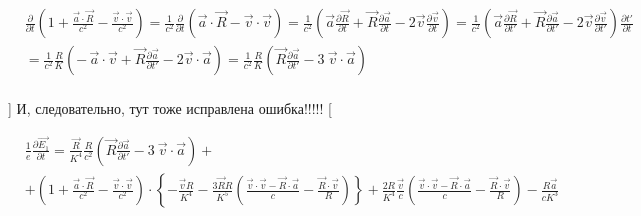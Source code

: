 \documentclass[11pt]{article}
\begin{document}
\begin{align}
  & \frac{\partial }{\partial t}\left( 1+\frac{\overrightarrow{a}\cdot \overrightarrow{R}}{{{c}^{2}}}-\frac{\overrightarrow{v}\cdot \overrightarrow{v}}{{{c}^{2}}} \right)=\frac{1}{{{c}^{2}}}\frac{\partial }{\partial t}\left( \overrightarrow{a}\cdot \overrightarrow{R}-\overrightarrow{v}\cdot \overrightarrow{v} \right)=\frac{1}{{{c}^{2}}}\left( \overrightarrow{a}\frac{\partial \overrightarrow{R}}{\partial t}+\overrightarrow{R}\frac{\partial \overrightarrow{a}}{\partial t}-2\overrightarrow{v}\frac{\partial \overrightarrow{v}}{\partial t} \right)=\frac{1}{{{c}^{2}}}\left( \overrightarrow{a}\frac{\partial \overrightarrow{R}}{\partial t'}+\overrightarrow{R}\frac{\partial \overrightarrow{a}}{\partial t'}-2\overrightarrow{v}\frac{\partial \overrightarrow{v}}{\partial t'} \right)\frac{\partial t'}{\partial t} \\ 
 & =\frac{1}{{{c}^{2}}}\frac{R}{K}\left( -\,\overrightarrow{a}\cdot \overrightarrow{v}+\overrightarrow{R}\frac{\partial \overrightarrow{a}}{\partial t'}-2\overrightarrow{v}\cdot \overrightarrow{a} \right)=\frac{1}{{{c}^{2}}}\frac{R}{K}\left( \overrightarrow{R}\frac{\partial \overrightarrow{a}}{\partial t'}-3\ \overrightarrow{v}\cdot \overrightarrow{a} \right) \\ 
\end{align}

{]} И, следовательно, тут тоже исправлена ошибка!!!!! {[}

\begin{align}
  & \frac{1}{e}\frac{\partial \overrightarrow{{{E}_{1}}}}{\partial t}=\frac{\overrightarrow{R}}{{{K}^{4}}}\frac{R}{{{c}^{2}}}\left( \overrightarrow{R}\frac{\partial \overrightarrow{a}}{\partial t'}-3\ \overrightarrow{v}\cdot \overrightarrow{a} \right)+ \\ 
 & +\left( 1+\frac{\overrightarrow{a}\cdot \overrightarrow{R}}{{{c}^{2}}}-\frac{\overrightarrow{v}\cdot \overrightarrow{v}}{{{c}^{2}}} \right)\cdot \left\{ -\frac{\overrightarrow{v}R}{{{K}^{4}}}-\frac{3\overrightarrow{R}R}{{{K}^{5}}}\left( \frac{\overrightarrow{v}\cdot \overrightarrow{v}-\overrightarrow{R}\cdot \overrightarrow{a}}{c}-\frac{\overrightarrow{R}\cdot \overrightarrow{v}}{R} \right) \right\}+\frac{2R}{{{K}^{4}}}\frac{\overrightarrow{v}}{c}\left( \frac{\overrightarrow{v}\cdot \overrightarrow{v}-\overrightarrow{R}\cdot \overrightarrow{a}}{c}-\frac{\overrightarrow{R}\cdot \overrightarrow{v}}{R} \right)-\frac{R\overrightarrow{a}}{c{{K}^{3}}} \\ 
\end{align}
\end{document}
